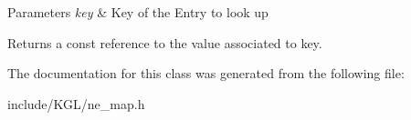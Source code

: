 \begin{DoxyParams}{Parameters}
{\em key} & Key of the Entry to look up \\
\hline
\end{DoxyParams}
\begin{DoxyReturn}{Returns}
a const reference to the value associated to {\ttfamily key}. 
\end{DoxyReturn}


The documentation for this class was generated from the following file\+:\begin{DoxyCompactItemize}
\item 
include/\+K\+G\+L/ne\+\_\+map.\+h\end{DoxyCompactItemize}
